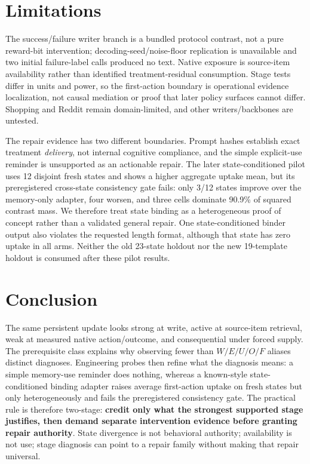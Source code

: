 \section{Limitations}
The success/failure writer branch is a bundled protocol contrast, not a pure reward-bit intervention; decoding-seed/noise-floor replication is unavailable and two initial failure-label calls produced no text. Native exposure is source-item availability rather than identified treatment-residual consumption. Stage tests differ in units and power, so the first-action boundary is operational evidence localization, not causal mediation or proof that later policy surfaces cannot differ. Shopping and Reddit remain domain-limited, and other writers/backbones are untested.

The repair evidence has two different boundaries. Prompt hashes establish exact treatment \emph{delivery}, not internal cognitive compliance, and the simple explicit-use reminder is unsupported as an actionable repair. The later state-conditioned pilot uses 12 disjoint fresh states and shows a higher aggregate uptake mean, but its preregistered cross-state consistency gate fails: only 3/12 states improve over the memory-only adapter, four worsen, and three cells dominate 90.9\% of squared contrast mass. We therefore treat state binding as a heterogeneous proof of concept rather than a validated general repair. One state-conditioned binder output also violates the requested length format, although that state has zero uptake in all arms. Neither the old 23-state holdout nor the new 19-template holdout is consumed after these pilot results.

\section{Conclusion}
The same persistent update looks strong at write, active at source-item retrieval, weak at measured native action/outcome, and consequential under forced supply. The prerequisite class explains why observing fewer than $W/E/U/O/F$ aliases distinct diagnoses. Engineering probes then refine what the diagnosis means: a simple memory-use reminder does nothing, whereas a known-style state-conditioned binding adapter raises average first-action uptake on fresh states but only heterogeneously and fails the preregistered consistency gate. The practical rule is therefore two-stage: \textbf{credit only what the strongest supported stage justifies, then demand separate intervention evidence before granting repair authority}. State divergence is not behavioral authority; availability is not use; stage diagnosis can point to a repair family without making that repair universal.

